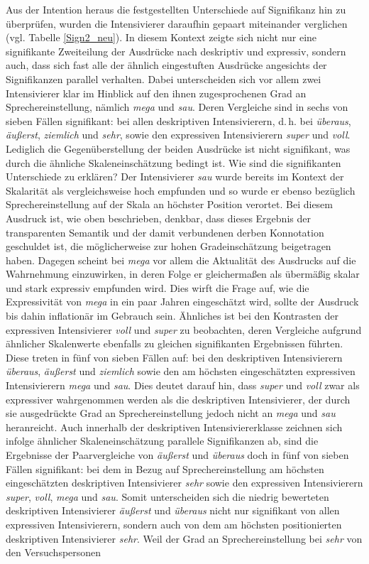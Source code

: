 Aus der Intention heraus die festgestellten Unterschiede auf Signifikanz hin zu überprüfen, wurden die Intensivierer daraufhin gepaart miteinander verglichen (vgl. Tabelle \ref{Sign2_neu}). In diesem Kontext zeigte sich nicht nur eine signifikante Zweiteilung der Ausdrücke nach deskriptiv und expressiv, sondern auch, dass sich fast alle der ähnlich eingestuften Ausdrücke angesichts der Signifikanzen parallel verhalten. Dabei unterscheiden sich vor allem zwei Intensivierer klar im Hinblick auf den ihnen zugesprochenen Grad an Sprechereinstellung, nämlich \textit{mega} und \textit{sau}. Deren Vergleiche sind in sechs von sieben Fällen signifikant: bei allen deskriptiven Intensivierern, d.\,h. bei \textit{überaus}, \textit{äußerst}, \textit{ziemlich} und \textit{sehr}, sowie den expressiven Intensivierern \textit{super} und \textit{voll}. Lediglich die Gegenüberstellung der beiden Ausdrücke ist nicht signifikant, was durch die ähnliche Skaleneinschätzung bedingt ist. Wie sind die signifikanten Unterschiede zu erklären? Der Intensivierer \textit{sau} wurde bereits im Kontext der Skalarität als vergleichsweise hoch empfunden und so wurde er ebenso bezüglich Sprechereinstellung auf der Skala an höchster Position verortet. Bei diesem Ausdruck ist, wie oben beschrieben, denkbar, dass dieses Ergebnis der transparenten Semantik und der damit verbundenen derben Konnotation geschuldet ist, die möglicherweise zur hohen Gradeinschätzung beigetragen haben. Dagegen scheint bei \textit{mega} vor allem die Aktualität des Ausdrucks auf die Wahrnehmung einzuwirken, in deren Folge er gleichermaßen als übermäßig skalar und stark expressiv empfunden wird. Dies wirft die Frage auf, wie die Expressivität von \textit{mega} in ein paar Jahren eingeschätzt wird, sollte der Ausdruck bis dahin inflationär im Gebrauch sein. Ähnliches ist bei den Kontrasten der expressiven Intensivierer \textit{voll} und \textit{super} zu beobachten, deren Vergleiche aufgrund ähnlicher Skalenwerte ebenfalls zu gleichen signifikanten Ergebnissen führten. Diese treten in fünf von sieben Fällen auf: bei den deskriptiven Intensivierern \textit{überaus}, \textit{äußerst} und \textit{ziemlich} sowie den am höchsten eingeschätzten expressiven Intensivierern \textit{mega} und \textit{sau}. Dies deutet darauf hin, dass \textit{super} und \textit{voll} zwar als expressiver wahrgenommen werden als die deskriptiven Intensivierer, der durch sie ausgedrückte Grad an Sprechereinstellung jedoch nicht an \textit{mega} und \textit{sau} heranreicht. Auch innerhalb der deskriptiven Intensiviererklasse zeichnen sich infolge ähnlicher Skaleneinschätzung parallele Signifikanzen ab, sind die Ergebnisse der Paarvergleiche von \textit{äußerst} und \textit{überaus} doch in fünf von sieben Fällen signifikant: bei dem in Bezug auf Sprechereinstellung am höchsten eingeschätzten deskriptiven Intensivierer \textit{sehr} sowie den expressiven Intensivierern \textit{super}, \textit{voll}, \textit{mega} und \textit{sau}. Somit unterscheiden sich die niedrig bewerteten deskriptiven Intensivierer \textit{äußerst} und \textit{überaus} nicht nur signifikant von allen expressiven Intensivierern, sondern auch von dem am höchsten positionierten deskriptiven Intensivierer \textit{sehr}. Weil der Grad an Sprechereinstellung bei \textit{sehr} von den Versuchspersonen 